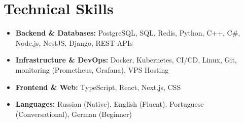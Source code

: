 \documentclass[11pt,a4paper,sans]{moderncv}
\begin{document}


	{}{}

	\section{Technical Skills}

	\begin{itemize}
		\item \textbf{Backend \& Databases:} PostgreSQL, SQL, Redis, Python, C++, C\#, Node.js, NestJS, Django, REST APIs
		\item \textbf{Infrastructure \& DevOps:} Docker, Kubernetes, CI/CD, Linux, Git, monitoring (Prometheus, Grafana), VPS Hosting
		\item \textbf{Frontend \& Web:} TypeScript, React, Next.js, CSS
		\item \textbf{Languages:} Russian (Native), English (Fluent), Portuguese (Conversational), German (Beginner)
	\end{itemize}
\end{document}
